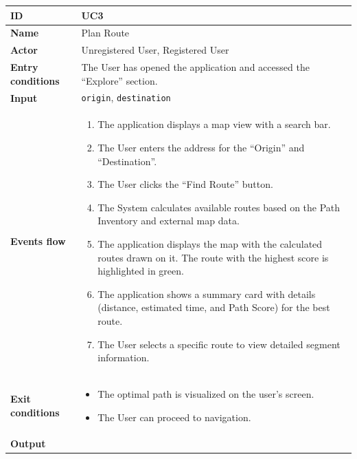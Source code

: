 \begin{table}[H]
\centering
\begin{tabularx}{\textwidth}{|m{3.5cm}|X|}
\hline
\textbf{ID} & UC3 \\ \hline
\textbf{Name} & Plan Route \\ \hline
\textbf{Actor} & Unregistered User, Registered User \\ \hline
\textbf{Entry conditions} & The User has opened the application and accessed the ``Explore'' section. \\ \hline
\textbf{Input} & \texttt{origin}, \texttt{destination} \\ \hline
\textbf{Events flow} & 
    \begin{enumerate}[nosep, leftmargin=*, before=\vspace{0.3em}, after=\vspace{0.3em}]
        \item The application displays a map view with a search bar.
        \item The User enters the address for the ``Origin'' and ``Destination''.
        \item The User clicks the ``Find Route'' button.
        \item The System calculates available routes based on the Path Inventory and external map data.
        \item The application displays the map with the calculated routes drawn on it. The route with the highest score is highlighted in green.
        \item The application shows a summary card with details (distance, estimated time, and Path Score) for the best route.
        \item The User selects a specific route to view detailed segment information.
    \end{enumerate} 
    \\ \hline
\textbf{Exit conditions} & 
    \begin{itemize}[nosep, leftmargin=*, before=\vspace{0.3em}, after=\vspace{0.3em}]
        \item The optimal path is visualized on the user's screen.
        \item The User can proceed to navigation.
    \end{itemize}
    \\ \hline
\textbf{Output} & 
    \begin{itemize}[nosep, leftmargin=*, before=\vspace{0.3em}, after=\vspace{0.3em}]

\end{itemize}
\end{tabularx}
\end{table}
